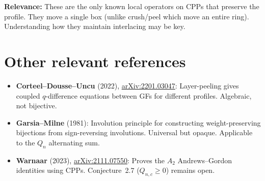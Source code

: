\documentclass[11pt]{article}
\begin{document}
\noindent\textbf{Relevance:} These are the only known local operators
on CPPs that preserve the profile.  They move a single box (unlike
crush/peel which move an entire ring).  Understanding how they
maintain interlacing may be key.


\section{Other relevant references}

\begin{itemize}
  \item \textbf{Corteel--Dousse--Uncu} (2022),
    \href{https://arxiv.org/abs/2201.03047}{arXiv:2201.03047}:
    Layer-peeling gives coupled $q$-difference equations between
    GFs for different profiles.  Algebraic, not bijective.
  \item \textbf{Garsia--Milne} (1981): Involution principle for
    constructing weight-preserving bijections from sign-reversing
    involutions.  Universal but opaque.  Applicable to the $Q_n$
    alternating sum.
  \item \textbf{Warnaar} (2023),
    \href{https://arxiv.org/abs/2111.07550}{arXiv:2111.07550}:
    Proves the $A_2$ Andrews--Gordon identities using CPPs.
    Conjecture~2.7 ($Q_{n,c} \geq 0$) remains open.
\end{itemize}
\end{document}
